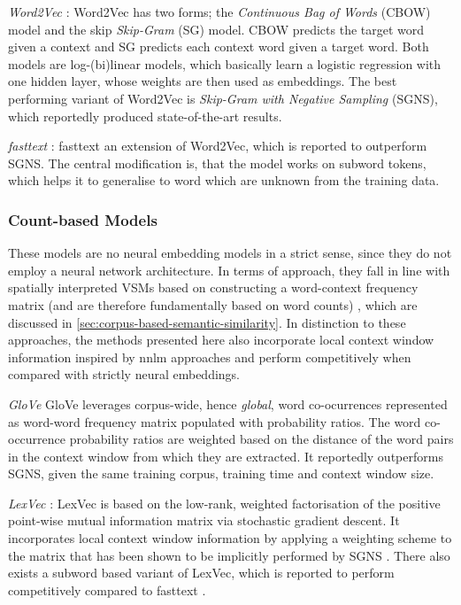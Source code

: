 \documentclass[11pt, numbers=noenddot]{scrreprt}
\let\cite\parencite  %
\begin{document}
\textit{Word2Vec} \cite{mikolovDistributedRepresentationsWords2013, mikolovLinguisticRegularitiesContinuous2013, mikolovEfficientEstimationWord2013}: Word2Vec has two forms; the \textit{Continuous Bag of Words} (CBOW) model and the skip \textit{Skip-Gram} (SG) model. CBOW predicts the target word given a context and SG predicts each context word given a target word. Both models are log-(bi)linear models, which basically learn a logistic regression with one hidden layer, whose weights are then used as embeddings. The best performing variant of Word2Vec is \textit{Skip-Gram with Negative Sampling} (SGNS), which reportedly produced state-of-the-art results.

\textit{fasttext} \cite{bojanowskiEnrichingWordVectors2017}: fasttext an extension of Word2Vec, which is reported to outperform SGNS. The central modification is, that the model works on subword tokens, which helps it to generalise to word which are unknown from the training data.

\subsubsection{Count-based Models}
These models are no neural embedding models in a strict sense, since they do not employ a neural network architecture. In terms of approach, they fall in line with spatially interpreted VSMs based on constructing a word-context frequency matrix (and are therefore fundamentally based on word counts) \cite{almeidaWordEmbeddingsSurvey2023, turneyFrequencyMeaningVector2010}, which are discussed in \cref{sec:corpus-based-semantic-similarity}. In distinction to these approaches, the methods presented here also incorporate local context window information inspired by \gls{nnlm} approaches and perform competitively when compared with strictly neural embeddings.

\textit{GloVe} \cite{penningtonGloVeGlobalVectors2014} GloVe leverages corpus-wide, hence \textit{global}, word co-ocurrences represented as word-word frequency matrix populated with probability ratios. The word co-occurrence probability ratios are weighted based on the distance of the word pairs in the context window from which they are extracted. It reportedly outperforms SGNS, given the same training corpus, training time and context window size.

\textit{LexVec} \cite{salleMatrixFactorizationUsing2016, salleEnhancingLexVecDistributed2016, salleWhyRoleNegative2019}: LexVec is based on the low-rank, weighted factorisation of the positive point-wise mutual information matrix via stochastic gradient descent. It incorporates local context window information by applying a weighting scheme to the matrix that has been shown to be implicitly performed by SGNS \cite{levyNeuralWordEmbedding2014}. There also exists a subword based variant of LexVec, which is reported to perform competitively compared to fasttext \cite{salleIncorporatingSubwordInformation2018}.
\end{document}
